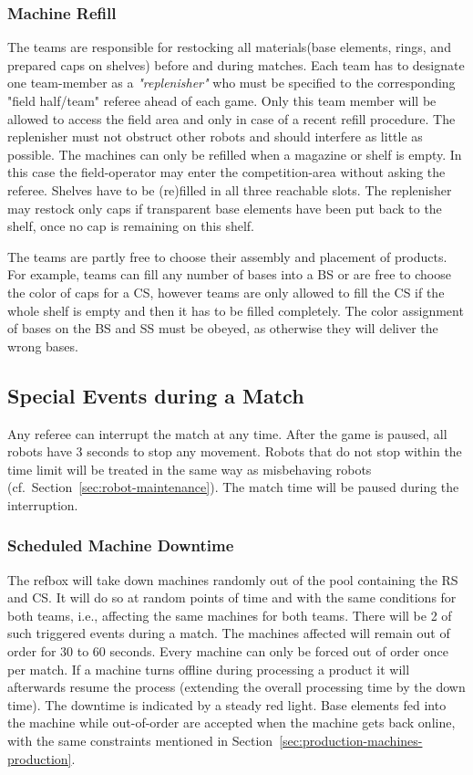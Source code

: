 \documentclass[12pt,twoside]{article}
\newcommand{\refsec}[1]{Section~\ref{#1}}
\begin{document}
\subsubsection{Machine Refill}
\label{sec:machine-refill}
The teams are responsible for restocking all materials(base elements,
rings, and prepared caps on shelves) before and during matches. Each
team has to designate one team-member as a \textit{"replenisher"} who
must be specified to the corresponding "field half/team" referee ahead
of each game.  Only this team member will be allowed to access the
field area and only in case of a recent refill procedure.  The
replenisher must not obstruct other robots and should interfere as
little as possible.  The machines can only be refilled when a magazine
or shelf is empty. In this case the field-operator may enter the
competition-area without asking the referee. Shelves have to be
(re)filled in all three reachable
slots. The replenisher may restock only caps if transparent base elements
have been put back to the shelf, once no cap is remaining on this shelf.

The teams are partly free to choose their assembly and placement of
products.
For example, teams can fill any number of bases into a BS or are free to choose the color of caps for a CS,
however teams are only allowed to fill the CS if the whole shelf is empty and then it has to be filled completely.
The color assignment of bases on
the BS and SS must be obeyed, as otherwise they will deliver the wrong
bases.

\subsection{Special Events during a Match}
\label{sec:during-match}
Any referee can interrupt the match at any time. After the game is
paused, all robots have 3 seconds to stop any movement.  Robots that
do not stop within the time limit will be treated in the same way as
misbehaving robots (cf.~\refsec{sec:robot-maintenance}).  The match
time will be paused during the interruption.

\subsubsection{Scheduled Machine Downtime}
\label{sec:out-of-order}
The refbox will take down machines randomly out of the pool containing
the RS and CS. It will do so at random points of time and with the
same conditions for both teams, i.e., affecting the same machines for
both teams. There will be 2 of such triggered events during a
match. The machines affected will remain out of order for 30 to 60
seconds. Every machine can only be forced out of order once per
match. If a machine turns offline during processing a product it will
afterwards resume the process (extending the overall processing time
by the down time). The downtime is indicated by a steady red
light. Base elements fed into the machine while out-of-order are
accepted when the machine gets back online, with the same constraints
mentioned in \refsec{sec:production-machines-production}.
\end{document}
